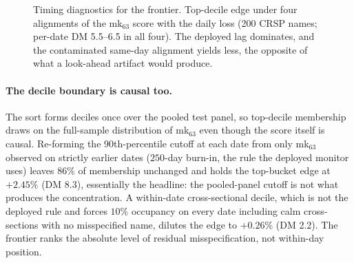 \documentclass[11pt]{article}
\theoremstyle{remark}
\begin{document}
\begin{figure}[t]
\centering
{}
\caption{Timing diagnostics for the frontier. Top-decile edge under four
alignments of the mk$_{63}$ score with the daily loss (200 CRSP names;
per-date DM 5.5--6.5 in all four). The deployed lag dominates, and the
contaminated same-day alignment yields less, the opposite of what a look-ahead artifact would produce.}
\label{fig:timing}
\end{figure}

\paragraph{The decile boundary is causal too.} The sort forms deciles
once over the pooled test panel, so top-decile membership draws on the
full-sample distribution of mk$_{63}$ even though the score itself is
causal. Re-forming the $90$th-percentile cutoff at each date from only
mk$_{63}$ observed on strictly earlier dates ($250$-day burn-in, the
rule the deployed monitor uses) leaves $86\%$ of membership unchanged
and holds the top-bucket edge at $+2.45\%$ (DM 8.3), essentially the
headline: the pooled-panel cutoff is not what produces the
concentration. A within-date cross-sectional decile, which is not the
deployed rule and forces $10\%$ occupancy on every date including calm
cross-sections with no misspecified name, dilutes the edge to
$+0.26\%$ (DM 2.2). The frontier ranks the absolute level of residual
misspecification, not within-day position.
\end{document}
